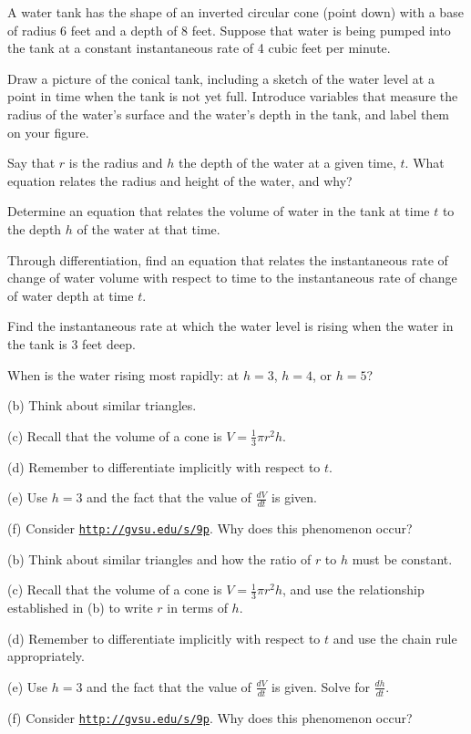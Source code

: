 \begin{activity} \label{A:3.5.1} A water tank has the shape of an inverted circular cone (point down) with a base of radius 6 feet and a depth of 8 feet.  Suppose that water is being pumped into the tank at a constant instantaneous rate of 4 cubic feet per minute.
\ba
	\item Draw a picture of the conical tank, including a sketch of the water level at a point in time when the tank is not yet full.  Introduce variables that measure the radius of the water's surface and the water's depth in the tank, and label them on your figure.
	\item Say that $r$ is the radius and $h$ the depth of the water at a given time, $t$.  What equation relates the radius and height of the water, and why?
	\item Determine an equation that relates the volume of water in the tank at time $t$ to the depth $h$ of the water at that time.
	\item Through differentiation, find an equation that relates the instantaneous rate of change of water volume with respect to time to the instantaneous rate of change of water depth at time $t$.
	\item Find the instantaneous rate at which the water level is rising when the water in the tank is 3 feet deep.
	\item When is the water rising most rapidly:  at $h = 3$, $h = 4$, or $h = 5$?
\ea
\end{activity}
\begin{smallhint}
\ba
	\item[(b)] Think about similar triangles.
	\item[(c)] Recall that the volume of a cone is $V = \frac{1}{3} \pi r^2 h$.
	\item[(d)] Remember to differentiate implicitly with respect to $t$.
	\item[(e)] Use $h = 3$ and the fact that the value of $\frac{dV}{dt}$ is given.
	\item[(f)] Consider \href{http://gvsu.edu/s/9p}{\texttt{http://gvsu.edu/s/9p}}.  Why does this phenomenon occur?
\ea
\end{smallhint}
\begin{bighint}
\ba
	\item[(b)] Think about similar triangles and how the ratio of $r$ to $h$ must be constant.
	\item[(c)] Recall that the volume of a cone is $V = \frac{1}{3} \pi r^2 h$, and use the relationship established in (b) to write $r$ in terms of $h$.
	\item[(d)] Remember to differentiate implicitly with respect to $t$ and use the chain rule appropriately.
	\item[(e)] Use $h = 3$ and the fact that the value of $\frac{dV}{dt}$ is given.  Solve for $\frac{dh}{dt}$.
	\item[(f)] Consider \href{http://gvsu.edu/s/9p}{\texttt{http://gvsu.edu/s/9p}}.  Why does this phenomenon occur?
\ea
\end{bighint}
